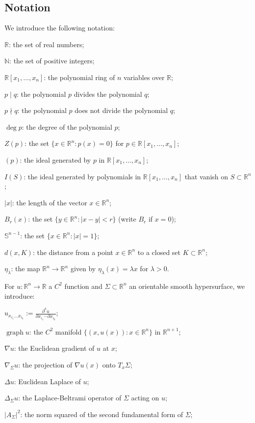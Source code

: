 \documentclass[pdflatex,sn-mathphys-num]{sn-jnl}%
\theoremstyle{thmstyleone}%
\theoremstyle{thmstyletwo}%
\theoremstyle{thmstylethree}%
\newcommand{\R}{\mathbb{R}}
\newcommand{\SSS}{\mathbb{S}}
\newcommand{\N}{\mathbb{N}}
\DeclareMathOperator{\graph}{graph}
\begin{document}
\subsection{Notation}
We introduce the following notation:

$\R$: the set of real numbers;

$\N$: the set of positive integers;

$\R[x_1,\dots,x_n]$: the polynomial ring of $n$ variables over $\R$;

$p\mid q$: the polynomial $p$ divides the polynomial $q$;

$p\nmid q$: the polynomial $p$ does not divide the polynomial $q$;

$\deg p$: the degree of the polynomial $p$;

$Z(p)$: the set $\{x\in\R^n:p(x)=0\}$ for $p\in \R[x_1,\dots,x_n]$;

$(p)$: the ideal generated by $p$ in $\R[x_1,\dots,x_n]$;

$I(S)$: the ideal generated by polynomials in $\R[x_1,\dots,x_n]$ that vanish on $S\subset \R^n$; 


$|x|$: the length of the vector $x\in \R^n$;

$B_r(x)$: the set $\{y\in \R^n:|x-y|<r\}$ (write $B_r$ if $x=0$);

$\SSS^{n-1}$: the set $\{x\in \R^n:|x|=1\}$;

$d(x,K)$: the distance from a point $x\in \R^n$ to a closed set $K\subset \R^n$;

$\eta_\lambda$: the map $\R^n\to \R^n$ given by $\eta_\lambda(x)=\lambda x$ for $\lambda>0$.

For $u:\R^n\to\R$ a $C^2$ function and $\Sigma\subset \R^n$ an orientable smooth hypersurface, we introduce:

$u_{x_{i_1}\dots x_{i_k}}:=\frac{\partial^k u}{\partial x_{i_1}\cdots\partial x_{i_k}}$;

$\graph u$: the $C^2$ manifold $\{(x,u(x)):x\in \R^n\}$ in $\R^{n+1}$;

$\nabla u$: the Euclidean gradient of $u$ at $x$;

$\nabla_\Sigma u$: the projection of $\nabla u(x)$ onto $T_x\Sigma$;

$\Delta u$: Euclidean Laplace of $u$;

$\Delta_\Sigma u$: the Laplace-Beltrami operator of $\Sigma$ acting on $u$;

$|A_\Sigma|^2$: the norm squared of the second fundamental form of $\Sigma$;
\end{document}
